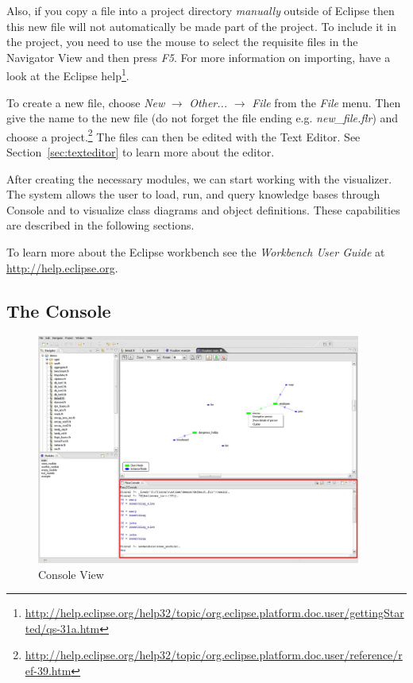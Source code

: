 Also, if you copy a file into a project directory \emph{manually} outside
of Eclipse then this new file will not automatically be made part of the
project.  To include it in the project, you need to use the mouse to
select the requisite
files in the \FVIZ Navigator View and then press \emph{F5}.
For more information on importing, have a look at the Eclipse help\footnote{
  \url{http://help.eclipse.org/help32/topic/org.eclipse.platform.doc.user/gettingStarted/qs-31a.htm}
}.

To create a new file, choose
\emph{New} $\rightarrow$ \emph{Other...}
$\rightarrow$ \emph{File} from the \emph{File} menu.
Then give the name to the new file (do not forget the file ending
e.g. \emph{new\_file.flr}) and choose a project.\footnote{
\url{http://help.eclipse.org/help32/topic/org.eclipse.platform.doc.user/reference/ref-39.htm}
}
The files can then be edited with the \FVIZ Text Editor.
See Section~\ref{sec:texteditor} to learn more about the editor.

After creating the necessary \FLORA modules, we can start working with the
visualizer. The system allows the user to load, run, and query \FLORA
knowledge bases through \FVIZ Console and to visualize class diagrams
and object definitions. These capabilities are described in the following
sections.

To learn more about the Eclipse workbench see the \emph{Workbench User Guide} at
\url{http://help.eclipse.org}.

\subsection{The \FVIZ Console}
\label{sec:consoleview}

\begin{figure}[tbh]
	\centering
		\includegraphics[width=0.95\textwidth]{fviz_console}
	\caption{\FVIZ Console View}
	\label{fig:fviz_console}
\end{figure}

